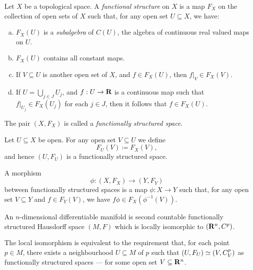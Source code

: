 \begin{definition}
    \label{def:functionally-structured-space}
    Let \(X\) be a topological space. A \emph{functional structure} on \(X\) is a
    map \(F_X\) on the collection of open sets of \(X\) such that, for any open set
    \(U \subseteq X\), we have:
    \begin{enumerate}[(a)]\setlength\itemsep{0em}
        \item \(F_X(U)\) is a
              \emph{subalgebra} of \(C(U)\), the algebra of continuous real valued maps
              on \(U\).

        \item \(F_X(U)\) contains all constant maps.

        \item If \(V \subseteq U\) is another open set of \(X\), and \(f \in F_X(U)\),
              then \(f|_V \in F_X(V)\).

        \item If \(U = \bigcup_{j \in J} U_j\), and \(f: U \to \mathbf{R}\) is a continuous map
              such that \(f|_{U_j} \in F_X(U_j)\) for each \(j \in J\), then it follows that
              \(f \in F_X(U)\).
    \end{enumerate}
    The pair \((X, F_X)\) is called a \emph{functionally structured space}.

    Let \(U \subseteq X\) be open. For any open set \(V \subseteq U\) we define
    \[
        F_U(V) \coloneq F_X(V),
    \]
    and hence \((U, F_U)\) is a functionally structured space.
\end{definition}

\begin{definition}
    \label{def:morphism-functionally-structured-spaces}
    A morphism
    \[
        \phi: (X, F_X) \to (Y, F_Y)
    \]
    between functionally structured spaces is a map \(\phi: X \to Y\) such that, for
    any open set \(V \subseteq Y\) and \(f \in F_Y(V)\), we have
    \(f \phi \in F_X(\phi^{-1}(V))\).
\end{definition}

\begin{definition}
    \label{def:second-def-Cp-manifold}
    An \(n\)-dimensional differentiable manifold is second countable functionally
    structured Hausdorff space \((M, F)\) which is locally isomorphic to
    \((\mathbf{R}^n, C^p)\).

    The local isomorphism is equivalent to the requirement that, for each
    point \(p \in M\), there exists a neighbourhood \(U \subseteq M\) of \(p\) such
    that \((U, F_U) \simeq (V, C_V^p)\) as functionally structured spaces --- for
    some open set \(V \subseteq \mathbf{R}^n\).
\end{definition}

